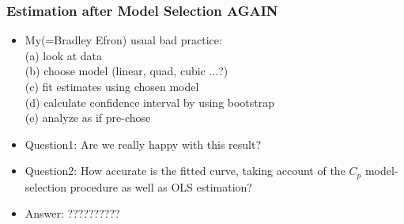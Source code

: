\documentclass{beamer}
\begin{document}
\begin{frame}
\frametitle{Estimation after Model Selection \textbf{AGAIN}}
\begin{itemize}
\item My(=Bradley Efron) usual bad practice:\\
(a) look at data\\
(b) choose model (linear, quad, cubic $\dots$?)\\
(c) fit estimates using chosen model\\
(d) calculate confidence interval by using bootstrap\\
(e) analyze as if pre-chose
\item Question1: Are we really happy with this result? \\ 
\item Question2: How accurate is the fitted curve, taking account of the $C_p$ model-selection procedure as well as OLS estimation?
\item Answer: ??????????
\end{itemize}
\end{frame}
\end{document}
